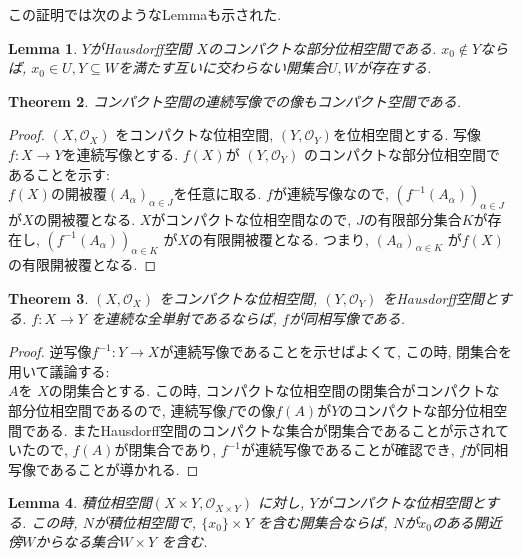 \documentclass[lualatex]{ltjsbook}
\newtheorem{theorem}{Theorem}[section]
\newtheorem{lemma}[theorem]{Lemma}
\theoremstyle{remark}
\theoremstyle{plain}
\begin{document}
この証明では次のようなLemmaも示された.
\begin{lemma}
	\label{lem:compact-separate}
	$Y$がHausdorff空間 $X$のコンパクトな部分位相空間である.  $x_0 \not\in Y$ならば, $x_0 \in U, Y \subseteq W$を満たす互いに交わらない開集合$U,W$が存在する.
\end{lemma}

\begin{theorem}
	コンパクト空間の連続写像での像もコンパクト空間である.
\end{theorem}

\begin{proof}
	$\left( X , \mathcal{O}_{X} \right)$ をコンパクトな位相空間, $\left( Y , \mathcal{O}_{Y} \right)$を位相空間とする. 
	写像$f: X \to Y$を連続写像とする. $f(X)$が $\left( Y , \mathcal{O}_{Y} \right)$ のコンパクトな部分位相空間であることを示す:\\
	$f(X)$の開被覆$\left( A_{\alpha} \right)_{\alpha \in J}$を任意に取る.
	$f$が連続写像なので, $\left( f^{-1}(A_{\alpha}) \right) _{\alpha \in J}$ が$X$の開被覆となる.
	$X$がコンパクトな位相空間なので,  $J$の有限部分集合$K$が存在し,  $\left( f^{-1}(A_{\alpha}) \right)_{\alpha \in K} $ が$X$の有限開被覆となる. つまり, $\left( A_{\alpha} \right) _{\alpha \in K}$ が$f(X)$の有限開被覆となる.

\end{proof}

\begin{theorem}
	$\left( X , \mathcal{O}_{X} \right)$ をコンパクトな位相空間, $\left( Y , \mathcal{O}_{Y} \right)$ をHausdorff空間とする. $f: X \to Y$ を連続な全単射であるならば, $f$が同相写像である.
\end{theorem}

\begin{proof}
	逆写像$f^{-1} :Y \to X$が連続写像であることを示せばよくて, この時, 閉集合を用いて議論する:\\
	$A$を $X$の閉集合とする. この時, コンパクトな位相空間の閉集合がコンパクトな部分位相空間であるので,  連続写像$f$での像$f(A)$が$Y$のコンパクトな部分位相空間である. 
	またHausdorff空間のコンパクトな集合が閉集合であることが示されていたので, $f(A)$が閉集合であり,  $f^{-1}$が連続写像であることが確認でき, $f$が同相写像であることが導かれる.
\end{proof}

\begin{lemma}
	積位相空間$\left( X\times Y , \mathcal{O}_{X\times Y} \right)$ に対し, $Y$がコンパクトな位相空間とする. 
	この時,  $N$が積位相空間で,  $\{x_0\} \times Y$ を含む開集合ならば,
	$N$が$x_0$のある開近傍$W$からなる集合$W\times Y$ を含む.
\end{lemma}
\end{document}
